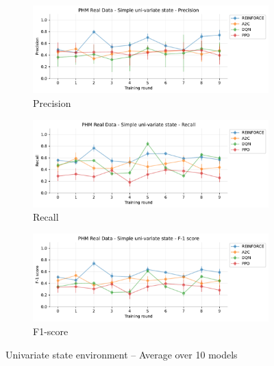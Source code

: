 \documentclass[a4paper, 12pt]{article}
\begin{document}
\begin{appendices}
\begin{figure}[h]
	\begin{subfigure}{\textwidth}
		\centering
		\includegraphics[width=\linewidth]{Singevariable_Pr.pdf}  
		\caption{Precision}
		\label{fig:tr-ss-pr}
	\end{subfigure} \par\smallskip
	
	\begin{subfigure}{\textwidth}
		\centering
		\includegraphics[width=\linewidth]{Singevariable_Rc.pdf}  
		\caption{Recall}
		\label{fig:tr-ss-rc}
	\end{subfigure} \par\smallskip
	
	\begin{subfigure}{\textwidth}
		\centering
		\includegraphics[width=\linewidth]{Singevariable_F1.pdf}  
		\caption{F1-score}
		\label{fig:tr-ss-f1}
	\end{subfigure} \par\smallskip
	\caption{Univariate state environment -- Average over 10 models}
	\label{fig:tr-ss-env}
\end{figure}


\end{appendices}
\end{document}
